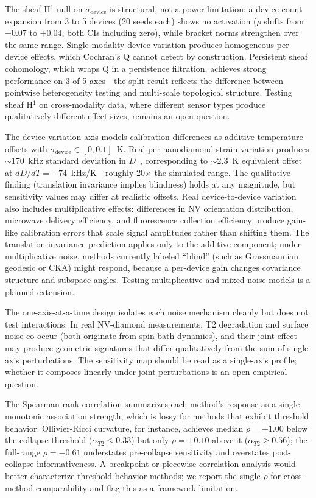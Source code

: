 \documentclass[11pt]{article}
\begin{document}
The sheaf H$^1$ null on $\sigma_\text{device}$ is structural, not a
power limitation: a device-count expansion from 3 to 5 devices (20
seeds each) shows no activation ($\rho$ shifts from $-0.07$ to
$+0.04$, both CIs including zero), while bracket norms strengthen
over the same range.  Single-modality device variation produces
homogeneous per-device effects, which Cochran's Q cannot detect by
construction.  Persistent sheaf cohomology, which wraps Q in a
persistence filtration, achieves strong performance on 3 of 5
axes---the split result reflects the difference between pointwise
heterogeneity testing and multi-scale topological structure.  Testing
sheaf H$^1$ on cross-modality data, where different sensor types
produce qualitatively different effect sizes, remains an open
question.

The device-variation axis models calibration differences as additive
temperature offsets with $\sigma_\text{device} \in [0, 0.1]$~K.
Real per-nanodiamond strain variation produces $\sim$170~kHz standard
deviation in $D$~\citep{fujiwara2024fluorescent}, corresponding to
$\sim$2.3~K equivalent offset at $dD/dT = -74$~kHz/K---roughly 20$\times$
the simulated range.  The qualitative finding (translation invariance
implies blindness) holds at any magnitude, but sensitivity values may
differ at realistic offsets.  Real device-to-device variation also
includes multiplicative effects: differences in NV orientation
distribution, microwave delivery efficiency, and fluorescence collection
efficiency produce gain-like calibration errors that scale signal
amplitudes rather than shifting them.  The translation-invariance prediction applies only
to the additive component; under multiplicative noise, methods currently
labeled ``blind'' (such as Grassmannian geodesic or CKA) might respond,
because a per-device gain changes covariance structure and subspace
angles.  Testing multiplicative and mixed noise models is a planned
extension.

The one-axis-at-a-time design isolates each noise mechanism cleanly but
does not test interactions.  In real NV-diamond measurements, T2
degradation and surface noise co-occur (both originate from spin-bath
dynamics), and their joint effect may produce geometric signatures that
differ qualitatively from the sum of single-axis perturbations.  The
sensitivity map should be read as a single-axis profile; whether it
composes linearly under joint perturbations is an open empirical
question.

The Spearman rank correlation summarizes each method's response as a
single monotonic association strength, which is lossy for methods that
exhibit threshold behavior.  Ollivier-Ricci curvature, for instance,
achieves median $\rho = +1.00$ below the collapse threshold
($\alpha_{T2} \leq 0.33$) but only $\rho = +0.10$ above it
($\alpha_{T2} \geq 0.56$); the full-range $\rho = -0.61$ understates
pre-collapse sensitivity and
overstates post-collapse informativeness.  A breakpoint or piecewise
correlation analysis would better characterize threshold-behavior
methods; we report the single $\rho$ for cross-method comparability and
flag this as a framework limitation.
\end{document}
